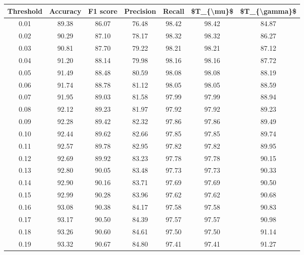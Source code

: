 \begin{tabular}{|c|c|c|c|c|c|c|}
\hline
 Threshold &  Accuracy &  F1 score &  Precision &  Recall &  \$T\_\{\textbackslash mu\}\$ &  \$T\_\{\textbackslash gamma\}\$ \\
\hline
      0.01 &     89.38 &     86.07 &      76.48 &   98.42 &      98.42 &         84.87 \\
      0.02 &     90.29 &     87.10 &      78.17 &   98.32 &      98.32 &         86.27 \\
      0.03 &     90.81 &     87.70 &      79.22 &   98.21 &      98.21 &         87.12 \\
      0.04 &     91.20 &     88.14 &      79.98 &   98.16 &      98.16 &         87.72 \\
      0.05 &     91.49 &     88.48 &      80.59 &   98.08 &      98.08 &         88.19 \\
      0.06 &     91.74 &     88.78 &      81.12 &   98.05 &      98.05 &         88.59 \\
      0.07 &     91.95 &     89.03 &      81.58 &   97.99 &      97.99 &         88.94 \\
      0.08 &     92.12 &     89.23 &      81.97 &   97.92 &      97.92 &         89.23 \\
      0.09 &     92.28 &     89.42 &      82.32 &   97.86 &      97.86 &         89.49 \\
      0.10 &     92.44 &     89.62 &      82.66 &   97.85 &      97.85 &         89.74 \\
      0.11 &     92.57 &     89.78 &      82.95 &   97.82 &      97.82 &         89.95 \\
      0.12 &     92.69 &     89.92 &      83.23 &   97.78 &      97.78 &         90.15 \\
      0.13 &     92.80 &     90.05 &      83.48 &   97.73 &      97.73 &         90.33 \\
      0.14 &     92.90 &     90.16 &      83.71 &   97.69 &      97.69 &         90.50 \\
      0.15 &     92.99 &     90.28 &      83.96 &   97.62 &      97.62 &         90.68 \\
      0.16 &     93.08 &     90.38 &      84.17 &   97.58 &      97.58 &         90.83 \\
      0.17 &     93.17 &     90.50 &      84.39 &   97.57 &      97.57 &         90.98 \\
      0.18 &     93.26 &     90.60 &      84.61 &   97.50 &      97.50 &         91.14 \\
      0.19 &     93.32 &     90.67 &      84.80 &   97.41 &      97.41 &         91.27 \\

\end{tabular}
